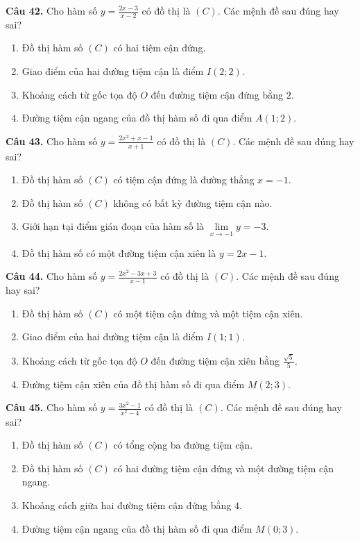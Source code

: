 \documentclass[12pt]{article}
\begin{document}
	\vspace{0.4cm}
	\noindent \textbf{Câu 42.} Cho hàm số $y = \frac{2x - 3}{x - 2}$ có đồ thị là $(C)$. Các mệnh đề sau đúng hay sai?
	\begin{enumerate}[label=\textbf{\alph*)}]
		\item Đồ thị hàm số $(C)$ có hai tiệm cận đứng.  
		\item Giao điểm của hai đường tiệm cận là điểm $I(2; 2)$.  
		\item Khoảng cách từ gốc tọa độ $O$ đến đường tiệm cận đứng bằng $2$.  
		\item Đường tiệm cận ngang của đồ thị hàm số đi qua điểm $A(1; 2)$.  
	\end{enumerate}
	
	\vspace{0.4cm}
	\noindent \textbf{Câu 43.} Cho hàm số $y = \frac{2x^2 + x - 1}{x + 1}$ có đồ thị là $(C)$. Các mệnh đề sau đúng hay sai?
	\begin{enumerate}[label=\textbf{\alph*)}]
		\item Đồ thị hàm số $(C)$ có tiệm cận đứng là đường thẳng $x = -1$.  
		\item Đồ thị hàm số $(C)$ không có bất kỳ đường tiệm cận nào.  
		\item Giới hạn tại điểm gián đoạn của hàm số là $\lim\limits_{x \to -1} y = -3$.  
		\item Đồ thị hàm số có một đường tiệm cận xiên là $y = 2x - 1$.  
	\end{enumerate}
	
	\vspace{0.4cm}
	\noindent \textbf{Câu 44.} Cho hàm số $y = \frac{2x^2 - 3x + 3}{x - 1}$ có đồ thị là $(C)$. Các mệnh đề sau đúng hay sai?
	\begin{enumerate}[label=\textbf{\alph*)}]
		\item Đồ thị hàm số $(C)$ có một tiệm cận đứng và một tiệm cận xiên.  
		\item Giao điểm của hai đường tiệm cận là điểm $I(1; 1)$.  
		\item Khoảng cách từ gốc tọa độ $O$ đến đường tiệm cận xiên bằng $\frac{\sqrt{5}}{5}$.  
		\item Đường tiệm cận xiên của đồ thị hàm số đi qua điểm $M(2; 3)$.  
	\end{enumerate}
	
	\vspace{0.4cm}
	\noindent \textbf{Câu 45.} Cho hàm số $y = \frac{3x^2 - 1}{x^2 - 4}$ có đồ thị là $(C)$. Các mệnh đề sau đúng hay sai?
	\begin{enumerate}[label=\textbf{\alph*)}]
		\item Đồ thị hàm số $(C)$ có tổng cộng ba đường tiệm cận.  
		\item Đồ thị hàm số $(C)$ có hai đường tiệm cận đứng và một đường tiệm cận ngang.  
		\item Khoảng cách giữa hai đường tiệm cận đứng bằng $4$.  
		\item Đường tiệm cận ngang của đồ thị hàm số đi qua điểm $M(0; 3)$.  
	\end{enumerate}
	
\end{document}
